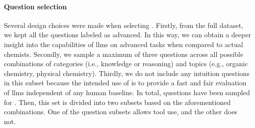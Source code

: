 \paragraph{Question selection} \label{sec:subset-selection}

 Several design choices were made when selecting \chembenchmini. Firstly, from the full dataset, we kept all the questions labeled as advanced. In this way, we can obtain a deeper insight into the capabilities of \glspl{llm} on advanced tasks when compared to actual chemists. Secondly, we sample a maximum of three questions across all possible combinations of categories (i.e., knowledge or reasoning) and topics (e.g., organic chemistry, physical chemistry). Thirdly, we do not include any intuition questions in this subset because the intended use of \chembenchmini is to provide a fast and fair evaluation of \glspl{llm} independent of any human baseline. In total,  questions have been sampled for \chembenchmini. Then, this set is divided into two subsets based on the aforementioned combinations. One of the question subsets allows tool use, and the other does not.

